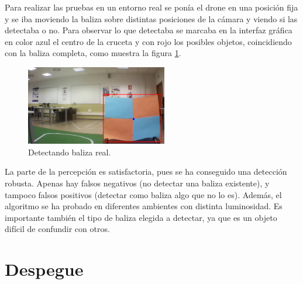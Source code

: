 \hspace{1cm} Para realizar las pruebas en un entorno real se pon\'ia el drone en una posici\'on fija y se iba moviendo la baliza sobre distintas posiciones de la c\'amara y viendo si las detectaba o no. Para observar lo que detectaba se marcaba en la interfaz gr\'afica en color azul el centro de la cruceta y con rojo los posibles objetos, coincidiendo con la baliza completa, como muestra la figura \ref{fig:Detectando_baliza_real}.

\begin{figure}[H]
	\centering
		\includegraphics[width=0.55\textwidth]{imgs/k_beacon21.jpg}
		\caption{Detectando baliza real.}
	\label{fig:Detectando_baliza_real}
\end{figure}


\hspace{1cm} La parte de la percepci\'on es satisfactoria, pues se ha conseguido una detecci\'on robusta. Apenas hay falsos negativos (no detectar una baliza existente), y tampoco falsos positivos (detectar como baliza algo que no lo es). Adem\'as, el algoritmo se ha probado en diferentes ambientes con distinta luminosidad. Es importante tambi\'en el tipo de baliza elegida a detectar, ya que es un objeto dif\'icil de confundir con otros.


\section{Despegue}


